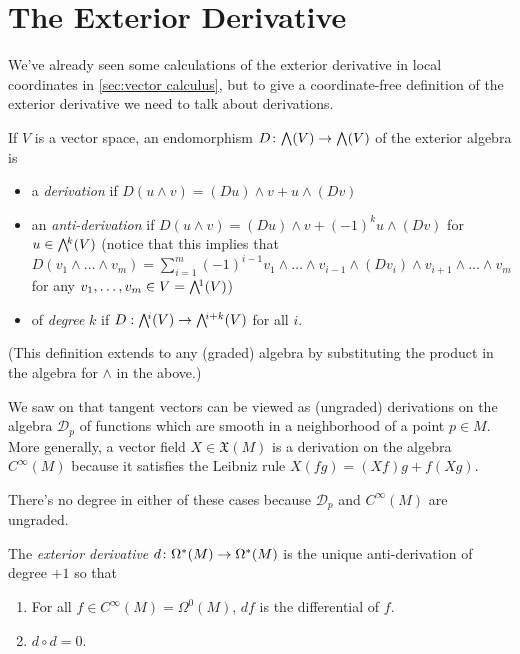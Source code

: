 
\section{The Exterior Derivative}

We've already seen some calculations of the exterior derivative in local coordinates in \cref{sec:vector calculus}, but to give a coordinate-free definition of the exterior derivative we need to talk about derivations.

\begin{definition}\label{def:derivation}
	If $V$ is a vector space, an endomorphism $D\from \ext{}(V) \to \ext{}(V)$ of the exterior algebra is
	\begin{itemize}
		\item a \emph{derivation} if $D(u \wedge v) = (Du) \wedge v + u \wedge (Dv)$
		\item an \emph{anti-derivation} if $D(u\wedge v) = (Du) \wedge v + (-1)^k u \wedge (Dv)$ for $u \in \ext{k}(V)$ (notice that this implies that $D(v_1 \wedge \dots \wedge v_m) = \sum_{i=1}^m (-1)^{i-1} v_1 \wedge \dots \wedge v_{i-1} \wedge (D v_i) \wedge v_{i+1} \wedge \dots \wedge v_m$ for any $v_1, \dots , v_m \in V = \ext{1}(V)$)
		\item of \emph{degree} $k$ if $D: \ext{i}(V) \to \ext{i+k}(V)$ for all $i$.
	\end{itemize}
	(This definition extends to any (graded) algebra by substituting the product in the algebra for $\wedge$ in the above.)
\end{definition}

\begin{example}
	We saw on  that tangent vectors can be viewed as (ungraded) derivations on the algebra $\mathcal{D}_p$ of functions which are smooth in a neighborhood of a point $p \in M$. More generally, a vector field $X \in \mathfrak{X}(M)$ is a derivation on the algebra $C^\infty(M)$ because it satisfies the Leibniz rule $X(fg) = (Xf)g + f(Xg)$.
	
	There's no degree in either of these cases because $\mathcal{D}_p$ and $C^\infty(M)$ are ungraded.
\end{example}

\begin{definition}\label{def:exterior derivative}
	The \emph{exterior derivative} $d \colon\thinspace\! \Omega^\ast(M) \to \Omega^\ast(M)$ is the unique anti-derivation of degree $+1$ so that
	\begin{enumerate}
		\item \label{it:d_0 is differential} For all $f \in C^\infty(M) = \Omega^0(M)$, $df$ is the differential of $f$.
		\item \label{it:d^2=0} $d \circ d = 0$.
	\end{enumerate}
\end{definition}

